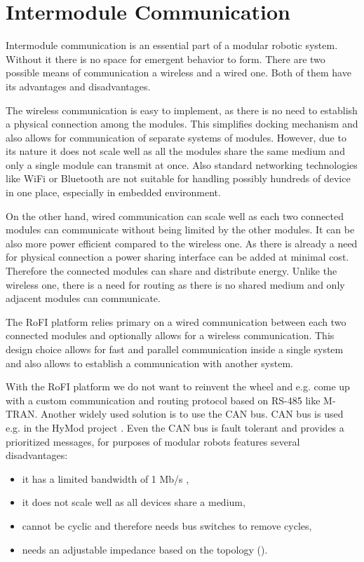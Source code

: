 \section{Intermodule Communication}\label{sec:communication}

Intermodule communication is an essential part of a modular robotic system.
Without it there is no space for emergent behavior to form. There are two
possible means of communication a wireless and a wired one. Both of them have
its advantages and disadvantages.

The wireless communication is easy to implement, as there is no need to
establish a physical connection among the modules. This simplifies docking
mechanism and also allows for communication of separate systems of modules.
However, due to its nature it does not scale well as all the modules share the
same medium and only a single module can transmit at once. Also standard
networking technologies like WiFi or Bluetooth are not suitable for handling
possibly hundreds of device in one place, especially in embedded environment.

On the other hand, wired communication can scale well as each two connected
modules can communicate without being limited by the other modules. It can be
also more power efficient compared to the wireless one. As there is already a
need for physical connection a power sharing interface can be added at minimal
cost. Therefore the connected modules can share and distribute energy. Unlike
the wireless one, there is a need for routing as there is no shared medium and
only adjacent modules can communicate.

The RoFI platform relies primary on a wired communication between each two
connected modules and optionally allows for a wireless communication. This
design choice allows for fast and parallel communication inside a single system
and also allows to establish a communication with another system.

With the RoFI platform we do not want to reinvent the wheel and e.g. come up
with a custom communication and routing protocol based on RS-485 like M-TRAN.
Another widely used solution is to use the CAN bus. CAN bus is used e.g. in the
HyMod project \cite{parrott_hymod:_2016}. Even the CAN bus is fault tolerant and
provides a prioritized messages, for purposes of modular robots features several
disadvantages:
\begin{itemize}
    \item it has a limited bandwidth of 1 Mb/s \cite{noauthor_road_2013},
    \item it does not scale well as all devices share a medium,
    \item cannot be cyclic and therefore needs bus switches to remove cycles,
    \item needs an adjustable impedance based on the topology
    (\cite{parrott_hymod:_2016}).
\end{itemize}

